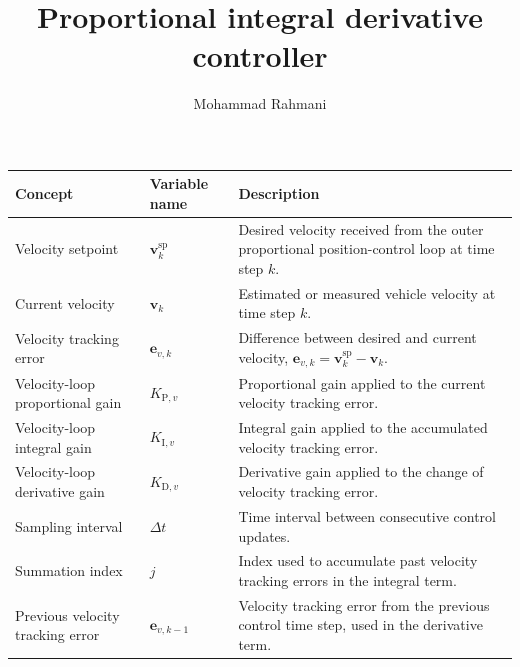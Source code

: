 \documentclass[a4paper]{article}
\title{Proportional integral derivative controller}
\date{}
\author{Mohammad Rahmani}
\begin{document}
   \maketitle

   \begin{table}[H]
      \centering
      \small
      \setlength{\tabcolsep}{4pt}
      \begin{tabular}{p{} p{} p{}}
         \hline
         \textbf{Concept} & \textbf{Variable name} & \textbf{Description} \\
         \hline

         Velocity setpoint
         & $\mathbf{v}^{\mathrm{sp}}_k$
         & Desired velocity received from the outer proportional position-control loop at time step $k$. \\

         Current velocity
         & $\mathbf{v}_k$
         & Estimated or measured vehicle velocity at time step $k$. \\

         Velocity tracking error
         & $\mathbf{e}_{v,k}$
         & Difference between desired and current velocity, $\mathbf{e}_{v,k}=\mathbf{v}^{\mathrm{sp}}_k-\mathbf{v}_k$. \\

         Velocity-loop proportional gain
         & $K_{\mathrm{P},v}$
         & Proportional gain applied to the current velocity tracking error. \\

         Velocity-loop integral gain
         & $K_{\mathrm{I},v}$
         & Integral gain applied to the accumulated velocity tracking error. \\

         Velocity-loop derivative gain
         & $K_{\mathrm{D},v}$
         & Derivative gain applied to the change of velocity tracking error. \\

         Sampling interval
         & $\Delta t$
         & Time interval between consecutive control updates. \\

         Summation index
         & $j$
         & Index used to accumulate past velocity tracking errors in the integral term. \\

         Previous velocity tracking error
         & $\mathbf{e}_{v,k-1}$
         & Velocity tracking error from the previous control time step, used in the derivative term. \\


\end{tabular}
\end{table}
\end{document}
